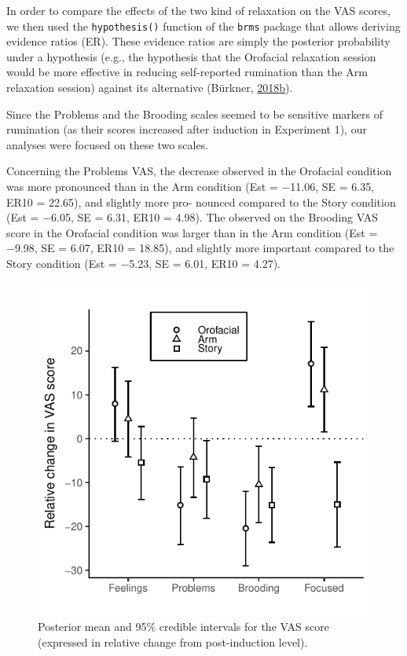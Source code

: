 \documentclass[a4paper,12pt,twoside,onecolumn,openright,final,oldfontcommands]{memoir}
\begin{document}
In order to compare the effects of the two kind of relaxation on the VAS scores, we then used the \texttt{hypothesis()} function of the \texttt{brms} package that allows deriving evidence ratios (ER). These evidence ratios are simply the posterior probability under a hypothesis (e.g., the hypothesis that the Orofacial relaxation session would be more effective in reducing self-reported rumination than the Arm relaxation session) against its alternative (Bürkner, \protect\hyperlink{ref-R-brms}{2018}\protect\hyperlink{ref-R-brms}{b}).

Since the Problems and the Brooding scales seemed to be sensitive markers of rumination (as their scores increased after induction in Experiment 1), our analyses were focused on these two scales.

Concerning the Problems VAS, the decrease observed in the Orofacial condition was more pronounced than in the Arm condition (Est = −11.06, SE = 6.35, ER10 = 22.65), and slightly more pro- nounced compared to the Story condition (Est = −6.05, SE = 6.31, ER10 = 4.98). The observed on the Brooding VAS score in the Orofacial condition was larger than in the Arm condition (Est = −9.98, SE = 6.07, ER10 = 18.85), and slightly more important compared to the Story condition (Est = −5.23, SE = 6.01, ER10 = 4.27).

\begin{figure}[ht]

{\centering \includegraphics[width=0.75\linewidth]{assets/emg_fig2} 

}

\caption{Posterior mean and 95\% credible intervals for the VAS score (expressed in relative change from post-induction level).}\label{fig:resultsemgfig2}
\end{figure}
\end{document}
